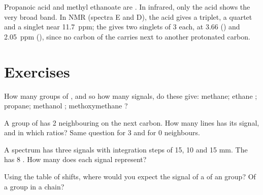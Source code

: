\begin{example}\label{ex:g12:proton-nmr:isomers}
Propanoic acid  and methyl ethanoate 
are . In infrared, only the acid shows the very broad 
band. In NMR (spectra E and D), the acid gives a triplet, a quartet and
a singlet near \qty{11.7}{ppm}; the  gives two singlets of 3 
each, at 3.66 () and \qty{2.05}{ppm} (), since no
carbon of the  carries  next to another protonated carbon.
\end{example}

\section{Exercises}

\begin{exercise}[$\star$]\label{exo:g12:proton-nmr:1}
How many groups of , and so how many signals, do these
 give: methane; ethane ; propane; methanol
; methoxymethane ?
\end{exercise}

\begin{exercise}[$\star$]\label{exo:g12:proton-nmr:2}
A group of  has 2 neighbouring  on the next carbon. How
many lines has its signal, and in which ratios? Same question for 3 and
for 0 neighbours.
\end{exercise}

\begin{exercise}[$\star$]\label{exo:g12:proton-nmr:3}
A spectrum has three signals with integration steps of 15, 10 and
15 mm. The  has 8 . How many  does each signal
represent?
\end{exercise}

\begin{exercise}[$\star$]\label{exo:g12:proton-nmr:4}
Using the table of shifts, where would you expect the signal of a 
of an  group? Of a  group in a chain?
\end{exercise}

